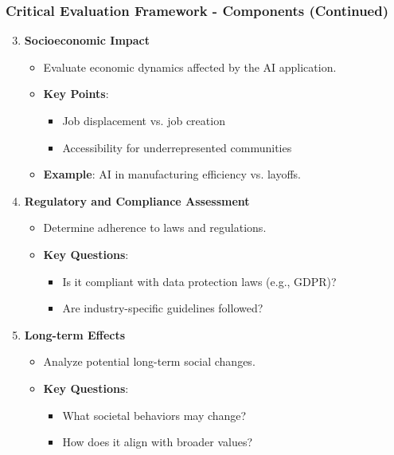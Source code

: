 \documentclass[aspectratio=169]{beamer}
\begin{document}
\begin{frame}[fragile]
    \frametitle{Critical Evaluation Framework - Components (Continued)}
    \begin{enumerate}\setcounter{enumi}{2}
        \item \textbf{Socioeconomic Impact}
            \begin{itemize}
                \item Evaluate economic dynamics affected by the AI application.
                \item \textbf{Key Points}:
                    \begin{itemize}
                        \item Job displacement vs. job creation
                        \item Accessibility for underrepresented communities
                    \end{itemize}
                \item \textbf{Example}: AI in manufacturing efficiency vs. layoffs.
            \end{itemize}
        \item \textbf{Regulatory and Compliance Assessment}
            \begin{itemize}
                \item Determine adherence to laws and regulations.
                \item \textbf{Key Questions}:
                    \begin{itemize}
                        \item Is it compliant with data protection laws (e.g., GDPR)?
                        \item Are industry-specific guidelines followed?
                    \end{itemize}
            \end{itemize}
        \item \textbf{Long-term Effects}
            \begin{itemize}
                \item Analyze potential long-term social changes.
                \item \textbf{Key Questions}:
                    \begin{itemize}
                        \item What societal behaviors may change?
                        \item How does it align with broader values?
                    \end{itemize}
            \end{itemize}
    \end{enumerate}
\end{frame}
\end{document}
